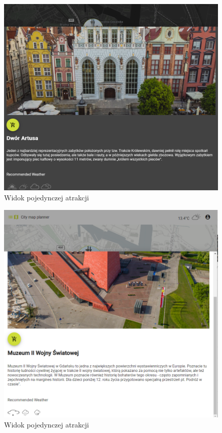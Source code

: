 \begin{figure}[H]
        \centering
        \includegraphics[width=1\textwidth]{attachments/atrakcjawidok}
        \caption{Widok pojedynczej atrakcji}
        \label{fig:mapawidokx}
\end{figure}
\begin{figure}[H]
    \centering
    \includegraphics[width=1\textwidth]{attachments/atrakcjawidok-light}
    \caption{Widok pojedynczej atrakcji}
    \label{fig:mapawidok}
\end{figure}
